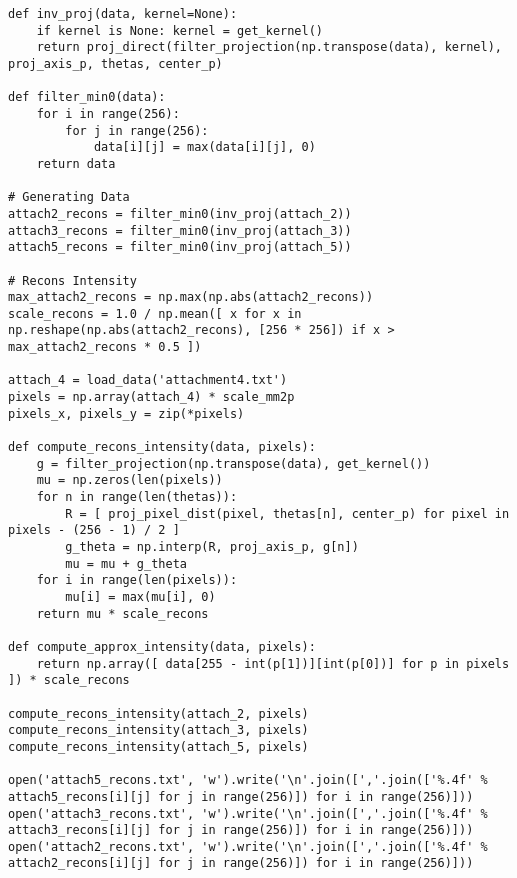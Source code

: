 \begin{verbatim}
def inv_proj(data, kernel=None):
    if kernel is None: kernel = get_kernel()
    return proj_direct(filter_projection(np.transpose(data), kernel), proj_axis_p, thetas, center_p)

def filter_min0(data):
    for i in range(256):
        for j in range(256):
            data[i][j] = max(data[i][j], 0)
    return data

# Generating Data
attach2_recons = filter_min0(inv_proj(attach_2))
attach3_recons = filter_min0(inv_proj(attach_3))
attach5_recons = filter_min0(inv_proj(attach_5))

# Recons Intensity
max_attach2_recons = np.max(np.abs(attach2_recons))
scale_recons = 1.0 / np.mean([ x for x in np.reshape(np.abs(attach2_recons), [256 * 256]) if x > max_attach2_recons * 0.5 ])

attach_4 = load_data('attachment4.txt')
pixels = np.array(attach_4) * scale_mm2p
pixels_x, pixels_y = zip(*pixels)

def compute_recons_intensity(data, pixels):
    g = filter_projection(np.transpose(data), get_kernel())
    mu = np.zeros(len(pixels))
    for n in range(len(thetas)):
        R = [ proj_pixel_dist(pixel, thetas[n], center_p) for pixel in pixels - (256 - 1) / 2 ]
        g_theta = np.interp(R, proj_axis_p, g[n])
        mu = mu + g_theta
    for i in range(len(pixels)):
        mu[i] = max(mu[i], 0)
    return mu * scale_recons

def compute_approx_intensity(data, pixels):
    return np.array([ data[255 - int(p[1])][int(p[0])] for p in pixels ]) * scale_recons

compute_recons_intensity(attach_2, pixels)
compute_recons_intensity(attach_3, pixels)
compute_recons_intensity(attach_5, pixels)

open('attach5_recons.txt', 'w').write('\n'.join([','.join(['%.4f' % attach5_recons[i][j] for j in range(256)]) for i in range(256)]))
open('attach3_recons.txt', 'w').write('\n'.join([','.join(['%.4f' % attach3_recons[i][j] for j in range(256)]) for i in range(256)]))
open('attach2_recons.txt', 'w').write('\n'.join([','.join(['%.4f' % attach2_recons[i][j] for j in range(256)]) for i in range(256)]))
\end{verbatim} 
